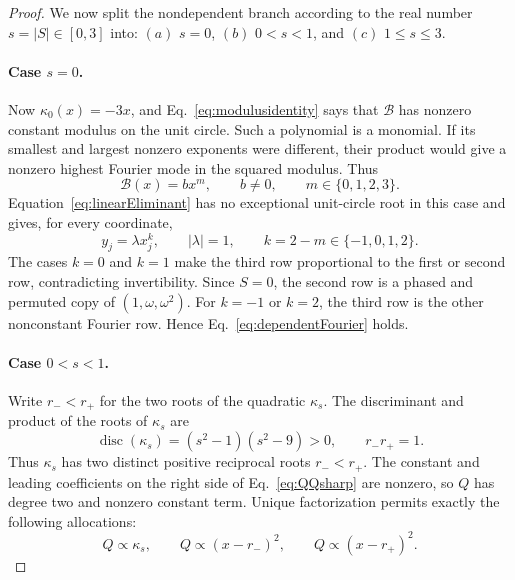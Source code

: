 \begin{proof}
We now split the nondependent branch according to the real number $s=|S|\in[0,3]$ into: $(a)$ $s=0$, $(b)$ $0<s<1$, and $(c)$ $1\leq s\leq3$.

\paragraph{\texorpdfstring{Case $s=0$}{Case s=0}.}

Now $\kappa_0(x)=-3x$, and Eq.~\eqref{eq:modulusidentity} says that $\mathcal B$ has nonzero constant modulus on the unit circle. Such a polynomial is a monomial. If its smallest and largest nonzero exponents were different, their product would give a nonzero highest Fourier mode in the squared modulus.  Thus
\begin{equation}
\mathcal B(x)=b x^m,
\qquad b\neq0,
\qquad m\in\{0,1,2,3\}.
\label{eq:Bmonomial}
\end{equation}
Equation~\eqref{eq:linearEliminant} has no exceptional unit-circle root in this case and gives, for every coordinate,
\begin{equation}
y_j=\lambda x_j^k,
\qquad |\lambda|=1,
\qquad k=2-m\in\{-1,0,1,2\}.
\label{eq:powerrelation}
\end{equation}
The cases $k=0$ and $k=1$ make the third row proportional to the first or second row, contradicting invertibility.  Since $S=0$, the second row is a phased and permuted copy of $(1,\omega,\omega^2)$.  For $k=-1$ or $k=2$, the third row is the other nonconstant Fourier row.  Hence Eq.~\eqref{eq:dependentFourier} holds.

\paragraph{\texorpdfstring{Case $0<s<1$}{Case 0<s<1}.}

Write $r_-<r_+$ for the two roots of the quadratic $\kappa_s$. The discriminant and product of the roots of $\kappa_s$ are
\begin{equation}
\operatorname{disc}(\kappa_s)=(s^2-1)(s^2-9)>0,
\qquad r_-r_+=1.
\label{eq:kappadiscriminant}
\end{equation}
Thus $\kappa_s$ has two distinct positive reciprocal roots $r_-<r_+$.  The constant and leading coefficients on the right side of Eq.~\eqref{eq:QQsharp} are nonzero, so $Q$ has degree two and nonzero constant term.  Unique factorization permits exactly the following allocations:
\begin{equation}
Q\propto\kappa_s,
\qquad
Q\propto(x-r_-)^2,
\qquad
Q\propto(x-r_+)^2.
\label{eq:rootallocations}
\end{equation}


\end{proof}
